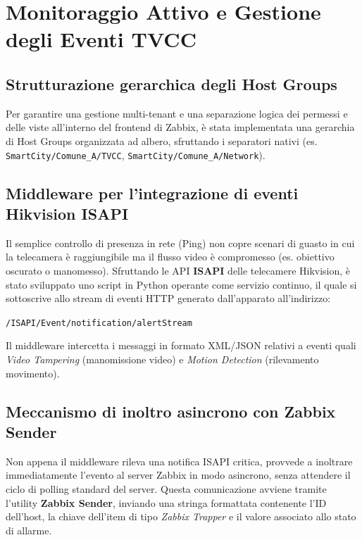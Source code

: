 \documentclass[12pt, a4paper]{report}
\begin{document}
\clearpage

\chapter{Monitoraggio Attivo e Gestione degli Eventi TVCC}
\section{Strutturazione gerarchica degli Host Groups}
Per garantire una gestione multi-tenant e una separazione logica dei permessi e delle viste all'interno del frontend di Zabbix, \`e stata implementata una gerarchia di Host Groups organizzata ad albero, sfruttando i separatori nativi (es. \texttt{SmartCity/Comune\_A/TVCC}, \texttt{SmartCity/Comune\_A/Network}).

\section{Middleware per l'integrazione di eventi Hikvision ISAPI}
Il semplice controllo di presenza in rete (Ping) non copre scenari di guasto in cui la telecamera \`e raggiungibile ma il flusso video \`e compromesso (es. obiettivo oscurato o manomesso). Sfruttando le API \textbf{ISAPI} delle telecamere Hikvision, \`e stato sviluppato uno script in Python operante come servizio continuo, il quale si sottoscrive allo stream di eventi HTTP generato dall'apparato all'indirizzo:
\begin{center}
    \texttt{/ISAPI/Event/notification/alertStream}
\end{center}
Il middleware intercetta i messaggi in formato XML/JSON relativi a eventi quali \textit{Video Tampering} (manomissione video) e \textit{Motion Detection} (rilevamento movimento).

\section{Meccanismo di inoltro asincrono con Zabbix Sender}
Non appena il middleware rileva una notifica ISAPI critica, provvede a inoltrare immediatamente l'evento al server Zabbix in modo asincrono, senza attendere il ciclo di polling standard del server. Questa comunicazione avviene tramite l'utility \textbf{Zabbix Sender}, inviando una stringa formattata contenente l'ID dell'host, la chiave dell'item di tipo \textit{Zabbix Trapper} e il valore associato allo stato di allarme.
\end{document}
